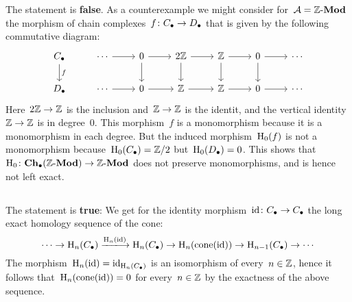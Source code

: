 \section{}





\subsection{}

The statement is \textbf{false}.
As a counterexample we might consider for~$\mathcal{A} = \text{$\mathbb{Z}$-$\mathbf{Mod}$}$ the morphism of chain complexes~$f \colon C_\bullet \to D_\bullet$ that is given by the following commutative diagram:
\[
  \begin{tikzcd}
      \Ccc
      \arrow{d}[right]{f}
    & \dotsb
      \arrow{r}
    & 0
      \arrow{r}
      \arrow{d}
    & 2\Integer
      \arrow{r}
      \arrow{d}
    & \Integer
      \arrow{r}
      \arrow{d}
    & 0
      \arrow{r}
      \arrow{d}
    & \dotsb
    \\
      \Dcc
    & \dotsb
      \arrow{r}
    & 0
      \arrow{r}
    & \Integer
      \arrow{r}
    & \Integer
      \arrow{r}
    & 0
      \arrow{r}
    & \dotsb
  \end{tikzcd}
\]
Here~$2\mathbb{Z} \to \mathbb{Z}$ is the inclusion and~$\mathbb{Z} \to \mathbb{Z}$ is the identit, and the vertical identity~$\mathbb{Z} \to \mathbb{Z}$ is in degree~$0$.
This morphism~$f$ is a monomorphism because it is a monomorphism in each degree.
But the induced morphism~$\operatorname{H}_0(f)$ is not a monomorphism because~$\operatorname{H}_0(C_\bullet) = \mathbb{Z}/2$ but~$\operatorname{H}_0(D_\bullet) = 0$.
This shows that~$\operatorname{H}_0 \colon \mathbf{Ch}_\bullet(\text{$\mathbb{Z}$-$\mathbf{Mod}$}) \to \text{$\mathbb{Z}$-$\mathbf{Mod}$}$ does not preserve monomorphisms, and is hence not left exact.





\subsection{}

The statement is \textbf{true}:
We get for the identity morphism~$\operatorname{id} \colon C_\bullet \to C_\bullet$ the long exact homology sequence of the cone:
\[
  \dotsb
  \to
  \Hl_n(\Ccc)
  \xlongto{\Hl_n(\id)}
  \Hl_n(\Ccc)
  \to
  \Hl_n(\cone(\id))
  \to
  \Hl_{n-1}(\Ccc)
  \to
  \dotsb
\]
The morphism~$\operatorname{H}_n(\operatorname{id}) = \operatorname{id}_{\operatorname{H}_n(C_\bullet)}$ is an isomorphism of every~$n \in \mathbb{Z}$, hence it follows that~$\operatorname{H}_n(\operatorname{cone}(\operatorname{id})) = 0$ for every~$n \in \mathbb{Z}$ by the exactness of the above sequence.





